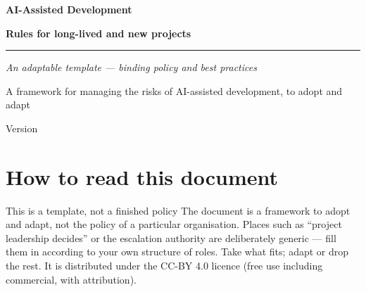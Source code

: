 




\thispagestyle{empty}
\vspace*{3cm}
{\sffamily\fontsize{30}{34}\selectfont\bfseries\color{navy}AI-Assisted Development\par}
\vspace{4pt}
{\sffamily\Large\bfseries\color{blue}Rules for long-lived and new projects\par}
\vspace{10pt}
{\color{blue}\rule{\linewidth}{1.5pt}}\par
\vspace{12pt}
{\sffamily\large\itshape\color{black!55}An adaptable template --- binding policy and best practices\par}
\vspace{20pt}
{\sffamily\small\color{black!50}
A framework for managing the risks of AI-assisted development, to adopt and adapt\par
\vspace{2pt}
Version \versionline\par}
\vfill
\newpage

\tableofcontents
\newpage

\section{How to read this document}

\begin{callout}[amber]{This is a template, not a finished policy}
The document is a framework to adopt and adapt, not the policy of a particular organisation.
Places such as \enquote{project leadership decides} or the escalation authority are deliberately generic --- fill them in according to your own structure of roles.
Take what fits; adapt or drop the rest.
It is distributed under the CC-BY 4.0 licence (free use including commercial, with attribution).
\end{callout}

